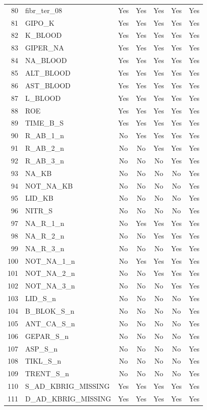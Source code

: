 \begin{longtable}{rlccccc}
80 & fibr\_ter\_08 & Yes & Yes & Yes & Yes & Yes \\
81 & GIPO\_K & Yes & Yes & Yes & Yes & Yes \\
82 & K\_BLOOD & Yes & Yes & Yes & Yes & Yes \\
83 & GIPER\_NA & Yes & Yes & Yes & Yes & Yes \\
84 & NA\_BLOOD & Yes & Yes & Yes & Yes & Yes \\
85 & ALT\_BLOOD & Yes & Yes & Yes & Yes & Yes \\
86 & AST\_BLOOD & Yes & Yes & Yes & Yes & Yes \\
87 & L\_BLOOD & Yes & Yes & Yes & Yes & Yes \\
88 & ROE & Yes & Yes & Yes & Yes & Yes \\
89 & TIME\_B\_S & Yes & Yes & Yes & Yes & Yes \\
90 & R\_AB\_1\_n & No & Yes & Yes & Yes & Yes \\
91 & R\_AB\_2\_n & No & No & Yes & Yes & Yes \\
92 & R\_AB\_3\_n & No & No & No & Yes & Yes \\
93 & NA\_KB & No & No & No & No & Yes \\
94 & NOT\_NA\_KB & No & No & No & No & Yes \\
95 & LID\_KB & No & No & No & No & Yes \\
96 & NITR\_S & No & No & No & No & Yes \\
97 & NA\_R\_1\_n & No & Yes & Yes & Yes & Yes \\
98 & NA\_R\_2\_n & No & No & Yes & Yes & Yes \\
99 & NA\_R\_3\_n & No & No & No & Yes & Yes \\
100 & NOT\_NA\_1\_n & No & Yes & Yes & Yes & Yes \\
101 & NOT\_NA\_2\_n & No & No & Yes & Yes & Yes \\
102 & NOT\_NA\_3\_n & No & No & No & Yes & Yes \\
103 & LID\_S\_n & No & No & No & No & Yes \\
104 & B\_BLOK\_S\_n & No & No & No & No & Yes \\
105 & ANT\_CA\_S\_n & No & No & No & No & Yes \\
106 & GEPAR\_S\_n & No & No & No & No & Yes \\
107 & ASP\_S\_n & No & No & No & No & Yes \\
108 & TIKL\_S\_n & No & No & No & No & Yes \\
109 & TRENT\_S\_n & No & No & No & No & Yes \\
110 & S\_AD\_KBRIG\_MISSING & Yes & Yes & Yes & Yes & Yes \\
111 & D\_AD\_KBRIG\_MISSING & Yes & Yes & Yes & Yes & Yes \\
\end{longtable}
